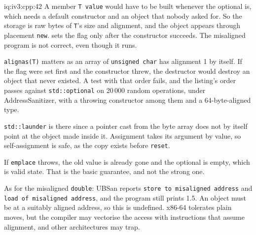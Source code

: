 \begin{solution}{iq:iv3:cpp:42}
A member \texttt{T value} would have to be built whenever the optional is, which needs a default constructor and an object that nobody asked for. So the storage is raw bytes of \texttt{T}'s size and alignment, and the object appears through placement \texttt{new}.  sets the flag only after the constructor succeeds. The misaligned program is not correct, even though it runs.
\label{lst:iv3:cp:opt}

\texttt{alignas(T)} matters as an array of \texttt{unsigned char} has alignment 1 by itself. If the flag were set first and the constructor threw, the destructor would destroy an object that never existed. A test with that order fails, and the listing's order passes against \texttt{std::optional} on 20\,000 random operations, under AddressSanitizer, with a throwing constructor among them and a 64-byte-aligned type.

\texttt{std::launder} is there since a pointer cast from the byte array does not by itself point at the object made inside it. Assignment takes its argument by value, so self-assignment is safe, as the copy exists before \texttt{reset}.

If \texttt{emplace} throws, the old value is already gone and the optional is empty, which is valid state. That is the basic guarantee, and not the strong one.

As for the misaligned \texttt{double}: UBSan reports \texttt{store to misaligned address} and \texttt{load of misaligned address}, and the program still prints 1.5. An object must be at a suitably aligned address, so this is undefined. x86-64 tolerates plain moves, but the compiler may vectorise the access with instructions that assume alignment, and other architectures may trap.

\end{solution}


